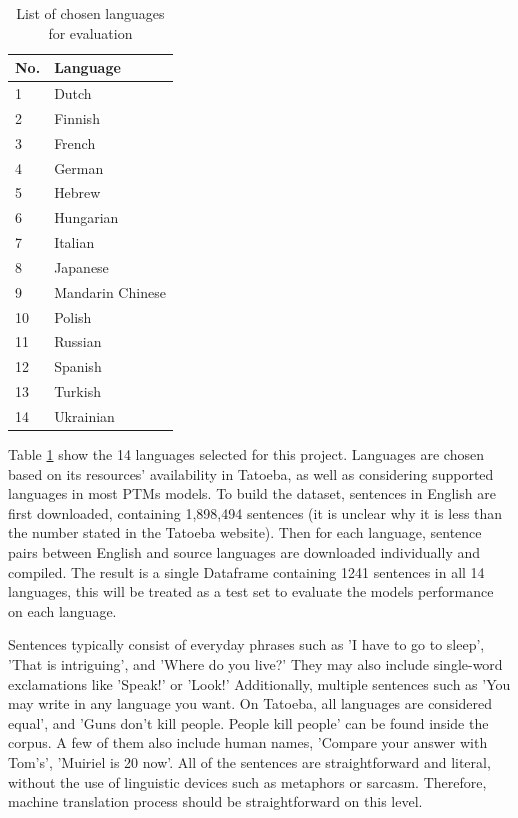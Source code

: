 \documentclass[a4paper]{article}
\begin{document}
\begin{table}[htbp]
    \centering
    \begin{tabular}{|l|l|}
        \hline
        \textbf{No.} & \textbf{Language} \\
        \hline
        1            & Dutch             \\
        2            & Finnish           \\
        3            & French            \\
        4            & German            \\
        5            & Hebrew            \\
        6            & Hungarian         \\
        7            & Italian           \\
        8            & Japanese          \\
        9            & Mandarin Chinese  \\
        10           & Polish            \\
        11           & Russian           \\
        12           & Spanish           \\
        13           & Turkish           \\
        14           & Ukrainian         \\
        \hline
    \end{tabular}
    \caption{List of chosen languages for evaluation}
    \label{table:eval_languages}
\end{table}

Table \ref{table:eval_languages} show the 14 languages selected for this project. Languages are chosen based on its resources' availability in Tatoeba, as well as considering supported languages in most PTMs models. To build the dataset, sentences in English are first downloaded, containing 1,898,494 sentences (it is unclear why it is less than the number stated in the Tatoeba website). Then for each language, sentence pairs between English and source languages are downloaded individually and compiled. The result is a single Dataframe containing 1241 sentences in all 14 languages, this will be treated as a test set to evaluate the models performance on each language.

Sentences typically consist of everyday phrases such as 'I have to go to sleep', 'That is intriguing', and 'Where do you live?' They may also include single-word exclamations like 'Speak!' or 'Look!' Additionally, multiple sentences such as 'You may write in any language you want. On Tatoeba, all languages are considered equal', and 'Guns don't kill people. People kill people' can be found inside the corpus. A few of them also include human names, 'Compare your answer with Tom's', 'Muiriel is 20 now'. All of the sentences are straightforward and literal, without the use of linguistic devices such as metaphors or sarcasm. Therefore, machine translation process should be straightforward on this level.
\end{document}
